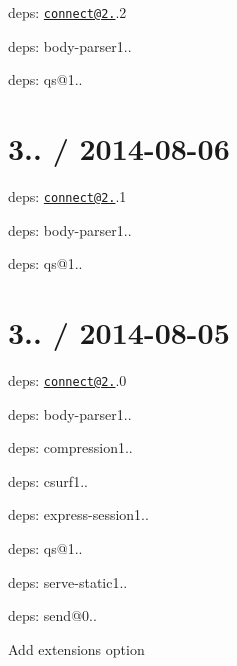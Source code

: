 {\ttfamily 
\begin{DoxyItemize}
\item deps\+: \href{mailto:connect@2.25}{\tt connect@2.}.2
\begin{DoxyItemize}
\item deps\+: body-\/parser1..
\item deps\+: qs@1..
\end{DoxyItemize}
\end{DoxyItemize}}

{\ttfamily \section*{3.. / 2014-\/08-\/06 }}

{\ttfamily }

{\ttfamily 
\begin{DoxyItemize}
\item deps\+: \href{mailto:connect@2.25}{\tt connect@2.}.1
\begin{DoxyItemize}
\item deps\+: body-\/parser1..
\item deps\+: qs@1..
\end{DoxyItemize}
\end{DoxyItemize}}

{\ttfamily \section*{3.. / 2014-\/08-\/05 }}

{\ttfamily }

{\ttfamily 
\begin{DoxyItemize}
\item deps\+: \href{mailto:connect@2.25}{\tt connect@2.}.0
\begin{DoxyItemize}
\item deps\+: body-\/parser1..
\item deps\+: compression1..
\item deps\+: csurf1..
\item deps\+: express-\/session1..
\item deps\+: qs@1..
\item deps\+: serve-\/static1..
\end{DoxyItemize}
\item deps\+: send@0..
\begin{DoxyItemize}
\item Add {\ttfamily extensions} option
\end{DoxyItemize}
\end{DoxyItemize}}

